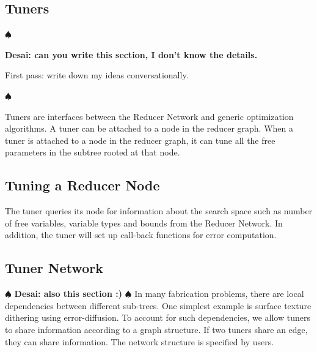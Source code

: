 \documentclass[annual]{acmsiggraph}
\newcommand{\note}[1]{\marginpar{\LARGE $\spadesuit$}
			$\spadesuit$ {\bf #1} $\spadesuit$}
\begin{document}
\subsection{Tuners}
\note{Desai: can you write this section, I don't know the details.

First pass: write down my ideas conversationally.
}

Tuners are interfaces between the Reducer Network and generic optimization algorithms.
A tuner can be attached to a node in the reducer graph.
When a tuner is attached to a node in the reducer graph, it can tune
all the free parameters in the subtree rooted at that node.
\subsection{Tuning a Reducer Node}
The tuner queries its node for information about the search space such as
number of free variables, variable types and bounds from the Reducer Network.
In addition, the tuner will set up call-back functions for error computation.

\subsection{Tuner Network}
\note{Desai: also this section :) }
In many fabrication problems, there are local dependencies between
different sub-trees. One simplest example is surface texture dithering
using error-diffusion. To account for such dependencies, we allow
tuners to share information according to a graph structure.
If two tuners share an edge, they can share information.
The network structure is specified by users.
\end{document}
